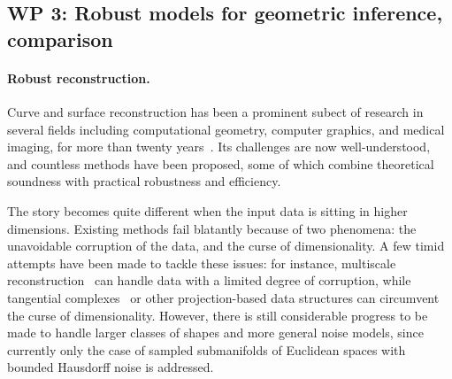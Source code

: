 \subsection*{WP 3:  Robust models for geometric inference, comparison } 


%
%







\paragraph{Robust reconstruction.}

Curve and surface reconstruction has been a prominent subect of
research in several fields including computational geometry, computer
graphics, and medical imaging, for more than twenty
years~\cite{dey-csr-2007}. Its challenges are now well-understood, and
countless methods have been proposed, some of which combine
theoretical soundness with practical robustness and efficiency.

The story becomes quite different when the input data is sitting in
higher dimensions. Existing methods fail blatantly because of two
phenomena: the unavoidable corruption of the data, and the curse of
dimensionality. A few timid attempts have been made to tackle these
issues: for instance, multiscale
reconstruction~\cite{geometrica-bgo-09} can handle data with a limited
degree of corruption, while tangential
complexes~\cite{geometrica-7142i} or other projection-based data
structures can circumvent the curse of dimensionality. However, there
is still considerable progress to be made to handle larger classes of
shapes and more general noise models, since currently only the case of
sampled submanifolds of Euclidean spaces with bounded Hausdorff noise
is addressed.

